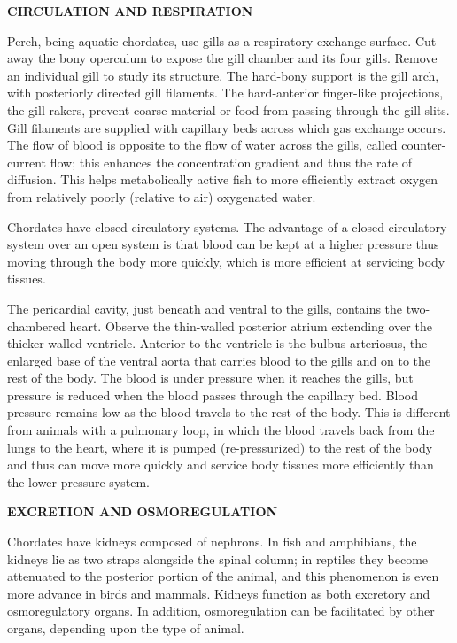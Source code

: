 \documentclass[
]{book}
\begin{document}
\textbf{CIRCULATION AND RESPIRATION}

Perch, being aquatic chordates, use gills as a respiratory exchange surface. Cut away the bony
operculum to expose the gill chamber and its four gills. Remove an individual gill to study its structure. The hard-bony support is the gill arch, with posteriorly directed gill filaments. The hard-anterior finger-like projections, the gill rakers, prevent coarse material or food from passing through the gill slits. Gill filaments are supplied with capillary beds across which gas exchange occurs. The flow of blood is opposite to the flow of water across the gills, called counter-current flow; this enhances the concentration gradient and thus the rate of diffusion. This helps metabolically active fish to more efficiently extract oxygen from relatively poorly (relative to air) oxygenated water.

Chordates have closed circulatory systems. The advantage of a closed circulatory system over an open system is that blood can be kept at a higher pressure thus moving through the body more quickly, which is more efficient at servicing body tissues.

The pericardial cavity, just beneath and ventral to the gills, contains the two-chambered heart. Observe the thin-walled posterior atrium extending over the thicker-walled ventricle. Anterior to the ventricle is the bulbus arteriosus, the enlarged base of the ventral aorta that carries blood to the gills and on to the rest of the body. The blood is under pressure when it reaches the gills, but pressure is reduced when the blood passes through the capillary bed. Blood pressure remains low as the blood travels to the rest of the body. This is different from animals with a pulmonary loop, in which the blood travels back from the lungs to the heart, where it is pumped (re-pressurized) to the rest of the body and thus can move more quickly and service body tissues more efficiently than the lower pressure system.

\textbf{EXCRETION AND OSMOREGULATION}

Chordates have kidneys composed of nephrons. In fish and amphibians, the kidneys lie as two straps alongside the spinal column; in reptiles they become attenuated to the posterior portion of the animal, and this phenomenon is even more advance in birds and mammals. Kidneys function as both excretory and osmoregulatory organs. In addition, osmoregulation can be facilitated by other organs, depending upon the type of animal.
\end{document}
